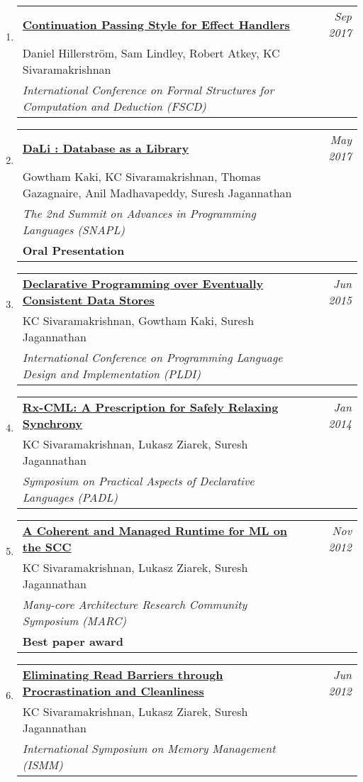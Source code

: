 \documentclass[10pt]{article}
\makeatletter
\newcommand{\lbar}[1]{{\color{#1}\ding{118}}\hspace*{2pt}}
\newenvironment{benumerate}[2]{
    \let\oldItem\item
    \def\item{\addtocounter{enumi}{-2}\oldItem}
    \begin{enumerate}[#2] \itemsep3pt
    \setcounter{enumi}{#1}
    \addtocounter{enumi}{1}}
  {\end{enumerate}}
\newenvironment{publication}[5]
{ \item
  \begin{tabular*}{7.5in}{p{6.3in}@{\extracolsep{\fill}}r}
    \href{#1}{\textbf{#2}} & \textit{#3}\\ #4 &\\ \textit{#5}&\\
  \end{tabular*}
} {}
\newenvironment{publicationNote}[6]
{ \item
  \begin{tabular*}{7.5in}{p{6.3in}@{\extracolsep{\fill}}r}
    \href{#1}{\textbf{#2}} & \textit{#3}\\ #4 &\\ \textit{#5}\\ \textbf{#6} \\
  \end{tabular*}
} {}
\newenvironment{region}[3]{%
  \vspace*{0.5ex}
  {\scalebox{1.4}{\textbf{#1}}}
  \begin{benumerate}{#3}{\color{RoyalBlue}#2}}
  {\end{benumerate}\vspace{0.8ex}}
\makeatother
\begin{document}
\begin{region} {\lbar{purple}Conference Publications}{{C}1}{9}
  \begin{publication} {http://kcsrk.info/papers/cps-handler-fscd17.pdf}
    {Continuation Passing Style for Effect Handlers}
    {Sep 2017} {Daniel Hillerström, Sam Lindley, Robert Atkey, KC Sivaramakrishnan}
    {International Conference on Formal Structures for Computation and Deduction (FSCD)}
  \end{publication}

  \begin{publicationNote} {http://kcsrk.info/papers/dali_snapl17.pdf}
    {DaLi : Database as a Library}
    {May 2017} {Gowtham Kaki, KC Sivaramakrishnan, Thomas Gazagnaire, Anil Madhavapeddy, Suresh Jagannathan}
    {The 2nd Summit on Advances in Programming Languages (SNAPL)}
    {Oral Presentation}
  \end{publicationNote}

  \begin{publication} {http://kcsrk.info/papers/quelea_pldi15.pdf}
    {Declarative Programming over Eventually Consistent Data Stores}
    {Jun 2015} {KC Sivaramakrishnan, Gowtham Kaki, Suresh Jagannathan}
    {International Conference on Programming Language Design and Implementation (PLDI)}
  \end{publication}

  \begin{publication}{http://kcsrk.info/papers/rxcml_padl14.pdf}
    {Rx-CML: A Prescription for Safely Relaxing Synchrony}
    {Jan 2014}{KC Sivaramakrishnan, Lukasz Ziarek, Suresh Jagannathan}
    {Symposium on Practical Aspects of Declarative Languages (PADL)}
  \end{publication}

  \begin{publicationNote}{http://kcsrk.info/papers/mmscc_marc12.pdf}
    {A Coherent and Managed Runtime for ML on the SCC}
    {Nov 2012}{KC Sivaramakrishnan, Lukasz Ziarek, Suresh Jagannathan}
    {Many-core Architecture Research Community Symposium (MARC)}
    {Best paper award}
  \end{publicationNote}

  \begin{publication}{http://kcsrk.info/papers/mmgc_ismm12.pdf}
    {Eliminating Read Barriers through Procrastination and Cleanliness}
    {Jun 2012}{KC Sivaramakrishnan, Lukasz Ziarek, Suresh Jagannathan}
    {International Symposium on Memory Management (ISMM)}
  \end{publication}


\end{region}
\end{document}
